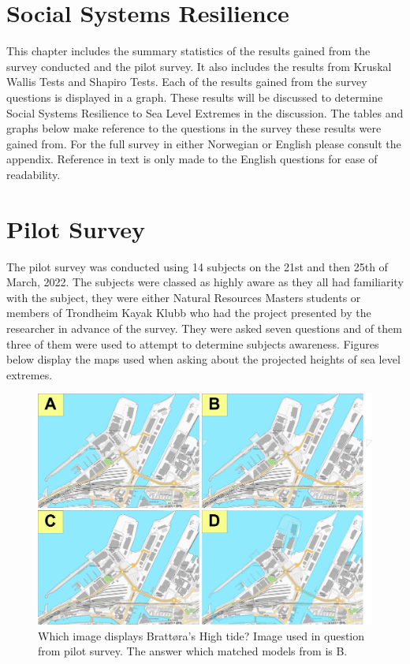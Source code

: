 \section{Social Systems Resilience}


This chapter includes the summary statistics of the results gained from the survey conducted and the pilot survey. It also includes the results from Kruskal Wallis Tests and Shapiro Tests. Each of the results gained from the survey questions is displayed in a graph. These results will be discussed to determine Social Systems Resilience to Sea Level Extremes in the discussion. The tables and graphs below make reference to  the questions in the survey these results were gained from. For the full survey in either Norwegian or English please consult the appendix. Reference in text is only made to the English questions for ease of readability. 

\section{Pilot Survey}

The pilot survey was conducted using 14 subjects on the 21st and then 25th of March, 2022. The subjects were classed as highly aware as they all had familiarity with the subject, they were either Natural Resources Masters students or members of Trondheim Kayak Klubb who had the project presented by the researcher in advance of the survey. They were asked seven questions and of them three of them were used to attempt to determine subjects awareness. Figures below display the maps used when asking about the projected heights of sea level extremes.

\begin{figure} [h]
    \centering
    \includegraphics{fig/brattora question on 2022 high tide quadrant.png}
    \caption{Which image displays Brattøra's High tide? Image used in question from pilot survey. The answer which matched models from \cite{kartverket_se_2021} is B.}
    \label{fig:Brattora_2022_hightide}
\end{figure}

